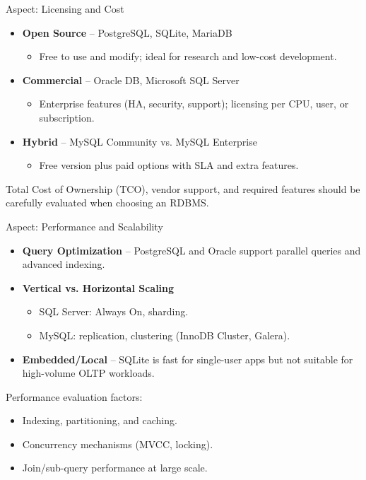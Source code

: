 \documentclass[aspectratio=169, table]{beamer}
\begin{document}
\begin{frame}{Aspect: Licensing and Cost}
\vspace{20pt}

\begin{itemize}
\item \textbf{Open Source} – PostgreSQL, SQLite, MariaDB  
\begin{itemize}
	\item Free to use and modify; ideal for research and low-cost development.
\end{itemize}
\item \textbf{Commercial} – Oracle DB, Microsoft SQL Server  
\begin{itemize}
	\item Enterprise features (HA, security, support); licensing per CPU, user, or subscription.
\end{itemize}
\item \textbf{Hybrid} – MySQL Community vs. MySQL Enterprise  
\begin{itemize}
	\item Free version plus paid options with SLA and extra features.
\end{itemize}
\end{itemize}

Total Cost of Ownership (TCO), vendor support, and required features should be carefully evaluated when choosing an RDBMS.

\end{frame}

\begin{frame}{Aspect: Performance and Scalability}
\vspace{20pt}

\begin{itemize}
\item \textbf{Query Optimization} – PostgreSQL and Oracle support parallel queries and advanced indexing.
\item \textbf{Vertical vs. Horizontal Scaling}  
\begin{itemize}
	\item SQL Server: Always On, sharding.  
	\item MySQL: replication, clustering (InnoDB Cluster, Galera).
\end{itemize}
\item \textbf{Embedded/Local} – SQLite is fast for single-user apps but not suitable for high-volume OLTP workloads.
\end{itemize}

Performance evaluation factors:
\begin{itemize}
\item Indexing, partitioning, and caching.  
\item Concurrency mechanisms (MVCC, locking).  
\item Join/sub-query performance at large scale.
\end{itemize}

\end{frame}
\end{document}
